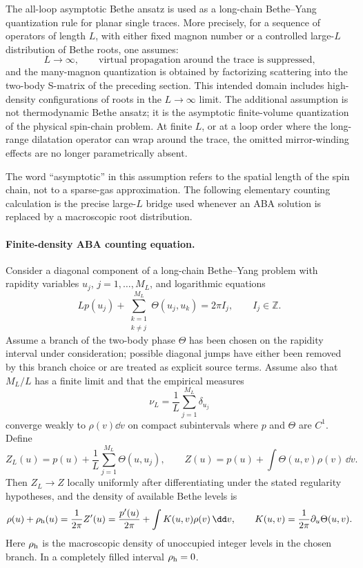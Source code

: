 \begin{assumption}
\label{ass:planar-n4-aba-regime}
The all-loop asymptotic Bethe ansatz is used as a long-chain
Bethe--Yang quantization rule for planar single traces.  More precisely, for
a sequence of operators of length \(L\), with either fixed magnon number or a
controlled large-\(L\) distribution of Bethe roots, one assumes:
\[
  L\to\infty,\qquad
  \text{virtual propagation around the trace is suppressed,}
\]
and the many-magnon quantization is obtained by factorizing scattering into
the two-body S-matrix of the preceding section.  This intended domain includes
high-density configurations of roots in the \(L\to\infty\) limit.  The
additional assumption is not thermodynamic Bethe ansatz; it is the
asymptotic finite-volume quantization of the physical spin-chain problem.
At finite \(L\), or at a loop order where the long-range dilatation operator
can wrap around the trace, the omitted mirror-winding effects are no longer
parametrically absent.
\end{assumption}

The word ``asymptotic'' in this assumption refers to the spatial length of the
spin chain, not to a sparse-gas approximation.  The following elementary
counting calculation is the precise large-\(L\) bridge used whenever an ABA
solution is replaced by a macroscopic root distribution.

\paragraph{Finite-density ABA counting equation.}
Consider a diagonal component of a long-chain Bethe--Yang problem with rapidity
variables \(u_j\), \(j=1,\ldots,M_L\), and logarithmic equations
\begin{equation}
  Lp(u_j)+\sum_{\substack{k=1\\k\neq j}}^{M_L}\Theta(u_j,u_k)
  =
  2\pi I_j,
  \qquad I_j\in\mathbb Z .
  \label{eq:planar-n4-aba-log-counting-form}
\end{equation}
Assume a branch of the two-body phase \(\Theta\) has been chosen on the
rapidity interval under consideration; possible diagonal jumps have either
been removed by this branch choice or are treated as explicit source terms.
Assume also that \(M_L/L\) has a finite limit and that the empirical measures
\[
  \nu_L=\frac1L\sum_{j=1}^{M_L}\delta_{u_j}
\]
converge weakly to \(\rho(v)\dd v\) on compact subintervals where
\(p\) and \(\Theta\) are \(C^1\).  Define
\[
  Z_L(u)=p(u)+\frac1L\sum_{j=1}^{M_L}\Theta(u,u_j),
  \qquad
  Z(u)=p(u)+\int\Theta(u,v)\rho(v)\,\dd v .
\]
Then \(Z_L\to Z\) locally uniformly after differentiating under the stated
regularity hypotheses, and the density of available Bethe levels is
\begin{equation}
  \rho(u)+\rho_{\rm h}(u)
  =
  \frac{1}{2\pi}Z'(u)
  =
  \frac{p'(u)}{2\pi}
  +
  \int K(u,v)\rho(v)\,\dd v,
  \qquad
  K(u,v)=\frac{1}{2\pi}\partial_u\Theta(u,v).
  \label{eq:planar-n4-aba-finite-density-counting-equation}
\end{equation}
Here \(\rho_{\rm h}\) is the macroscopic density of unoccupied integer levels
in the chosen branch.  In a completely filled interval \(\rho_{\rm h}=0\).

